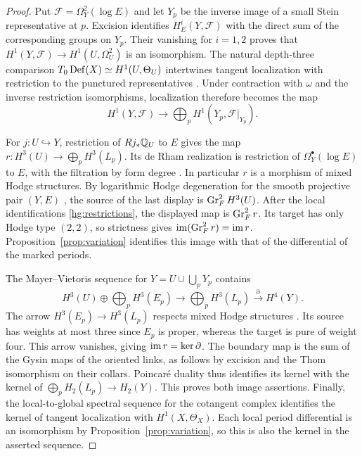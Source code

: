 \begin{proof}
Put $\mathcal F=\Omega_Y^2(\log E)$ and let $Y_p$ be the inverse
image of a small Stein representative at $p$. Excision identifies
$H^i_E(Y,\mathcal F)$ with the direct sum of the corresponding
groups on $Y_p$. Their vanishing for $i=1,2$ proves that
$H^1(Y,\mathcal F)\to H^1(U,\Omega_U^2)$ is an isomorphism.
The natural depth-three comparison
$T_0\operatorname{Def}(X)\simeq H^1(U,\Theta_U)$ intertwines tangent localization
with restriction to the punctured representatives
\cite[Lemma~4.1 and Remark~4.2]{FL}. Under contraction with
$\omega$ and the inverse restriction isomorphisms, localization
therefore becomes the map
\[
 H^1(Y,\mathcal F)\longrightarrow\bigoplus_p H^1(Y_p,\mathcal F|_{Y_p}).
\]

For $j:U\hookrightarrow Y$, restriction of $Rj_*\mathbb Q_U$ to $E$ gives the
map $r:H^3(U)\to\bigoplus_p H^3(L_p)$. Its de Rham realization is
restriction of $\Omega_Y^\bullet(\log E)$ to $E$, with the filtration
by form degree \cite[\S1.1]{FL}. In particular $r$ is a morphism of
mixed Hodge structures. By logarithmic Hodge degeneration for the
smooth projective pair $(Y,E)$ \cite[Corollary~3.2.13(ii)]{Del}, the
source of the last display is $\operatorname{Gr}_F^2H^3(U)$. After the local
identifications \eqref{hg:restrictions}, the displayed map is
$\operatorname{Gr}_F^2r$. Its target has only Hodge type $(2,2)$, so strictness
\cite[Theorem~2.3.5(iii)]{Del} gives
$\operatorname{im}(\operatorname{Gr}_F^2r)=\operatorname{im} r$. Proposition~\ref{prop:variation} identifies
this image with that of the differential of the marked periods.

The Mayer--Vietoris sequence for $Y=U\cup\bigcup_pY_p$ contains
\[
 H^3(U)\oplus\bigoplus_p H^3(E_p)
 \longrightarrow \bigoplus_p H^3(L_p)
 \xrightarrow{\partial} H^4(Y).
\]
The arrow $H^3(E_p)\to H^3(L_p)$ respects mixed Hodge structures
\cite[(1.4)]{FL}. Its source has weights at most three since $E_p$ is
proper, whereas the target is pure of weight four. This arrow
vanishes, giving $\operatorname{im} r=\ker\partial$. The boundary map is the sum
of the Gysin maps of the oriented links, as follows by excision and the
Thom isomorphism on their collars. Poincar\'e duality thus identifies
its kernel with the kernel of $\bigoplus_p H_2(L_p)\to H_2(Y)$.
This proves both image assertions. Finally, the local-to-global
spectral sequence for the cotangent complex identifies the kernel of
tangent localization with $H^1(X,\Theta_X)$. Each local period
differential is an isomorphism by Proposition~\ref{prop:variation},
so this is also the kernel in the asserted sequence.
\end{proof}
